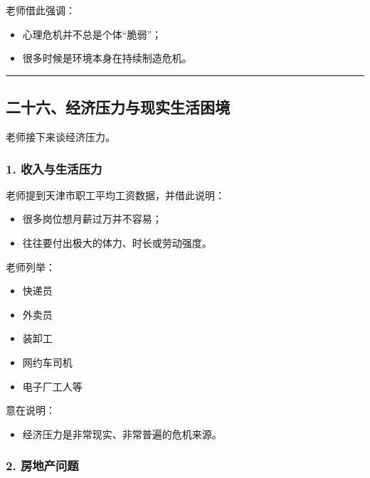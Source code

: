 \documentclass[
  chinese,
  9pt,
  a4paper,
]{ctexart}
\providecommand{\tightlist}{%
  \setlength{\itemsep}{0pt}\setlength{\parskip}{0pt}}
\begin{document}
老师借此强调：

\begin{itemize}
\tightlist
\item
  心理危机并不总是个体``脆弱''；
\item
  很多时候是环境本身在持续制造危机。
\end{itemize}

\begin{center}\rule{0.5\linewidth}{0.5pt}\end{center}

\subsection{二十六、经济压力与现实生活困境}\label{ux4e8cux5341ux516dux7ecfux6d4eux538bux529bux4e0eux73b0ux5b9eux751fux6d3bux56f0ux5883}

老师接下来谈经济压力。

\subsubsection{1.
收入与生活压力}\label{ux6536ux5165ux4e0eux751fux6d3bux538bux529b}

老师提到天津市职工平均工资数据，并借此说明：

\begin{itemize}
\tightlist
\item
  很多岗位想月薪过万并不容易；
\item
  往往要付出极大的体力、时长或劳动强度。
\end{itemize}

老师列举：

\begin{itemize}
\tightlist
\item
  快递员
\item
  外卖员
\item
  装卸工
\item
  网约车司机
\item
  电子厂工人等
\end{itemize}

意在说明：

\begin{itemize}
\tightlist
\item
  经济压力是非常现实、非常普遍的危机来源。
\end{itemize}

\subsubsection{2. 房地产问题}\label{ux623fux5730ux4ea7ux95eeux9898}
\end{document}
